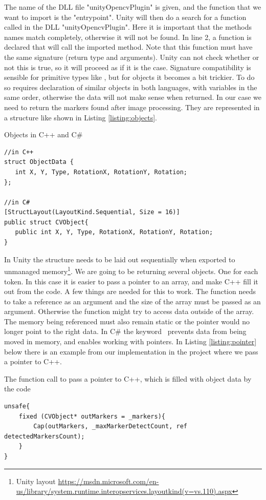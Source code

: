 The name of the DLL file "unityOpencvPlugin" is given, and the function that we want to import is the "entrypoint". Unity will then do a search for a function called  in the DLL "unityOpencvPlugin". Here it is important that the methods names match completely, otherwise it will not be found. In line 2, a function is declared that will call the imported method. Note that this function must have the same signature (return type and arguments). Unity can not check whether or not this is true, so it will proceed as if it is the case. Signature compatibility is sensible for primitive types like , but for objects it becomes a bit trickier. To do so requires declaration of similar objects in both languages, with variables in the same order, otherwise the data will not make sense when returned. In our case we need to return the markers found after image processing. They are represented in a structure like shown in Listing \ref{listing:objects}. 
\begin{listing}[H]
	\caption{Objects in C++ and C\#}
	\label{listing:objects}
	\begin{verbatim}
//in C++
struct ObjectData {
   int X, Y, Type, RotationX, RotationY, Rotation;
};

//in C#	
[StructLayout(LayoutKind.Sequential, Size = 16)]
public struct CVObject{
   public int X, Y, Type, RotationX, RotationY, Rotation;
}
	\end{verbatim}
\end{listing}
In Unity the structure needs to be laid out sequentially when exported to unmanaged memory\footnote{Unity layout \url{https://msdn.microsoft.com/en-us/library/system.runtime.interopservices.layoutkind(v=vs.110).aspx}}. We are going to be returning several objects. One for each token. In this case it is easier to pass a pointer to an array, and make C++ fill it out from the code. A few things are needed for this to work. The function needs to take a reference as an argument and the size of the array must be passed as an argument. Otherwise the function might try to access data outside of the array. The memory being referenced must also remain static or the pointer would no longer point to the right data. In C\# the keyword  prevents data from being moved in memory, and  enables working with pointers. In Listing \ref{listing:pointer} below there is an example from our implementation in the project where we pass a pointer to C++. %
\begin{listing}[H]
\caption{The function call to pass a pointer to C++, which is filled with object data by the code}
\label{listing:pointer}
\begin{verbatim}
unsafe{
	fixed (CVObject* outMarkers = _markers){
		Cap(outMarkers, _maxMarkerDetectCount, ref detectedMarkersCount);
	}
}
\end{verbatim}
\end{listing}
